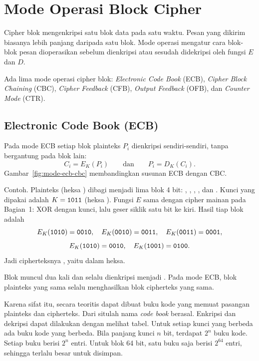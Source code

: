 \section{Mode Operasi Block Cipher}
\label{sec:mode-operasi}

Cipher blok mengenkripsi satu blok data pada satu waktu. Pesan yang dikirim
biasanya lebih panjang daripada satu blok. Mode operasi mengatur cara blok-blok
pesan dioperasikan sebelum dienkripsi atau sesudah didekripsi oleh fungsi $E$
dan $D$.

Ada lima mode operasi cipher blok: \textit{Electronic Code Book} (ECB),
\textit{Cipher Block Chaining} (CBC), \textit{Cipher Feedback} (CFB),
\textit{Output Feedback} (OFB), dan \textit{Counter Mode} (CTR).

\subsection{Electronic Code Book (ECB)}

Pada mode ECB setiap blok plainteks $P_i$ dienkripsi sendiri-sendiri, tanpa
bergantung pada blok lain:
\begin{equation}
C_i = E_K(P_i) \qquad \text{dan} \qquad P_i = D_K(C_i).
\label{eq:ecb}
\end{equation}
Gambar~\ref{fig:mode-ecb-cbc} membandingkan susunan ECB dengan CBC.



Contoh. Plainteks  (heksa ) dibagi menjadi
lima blok 4 bit: , , , , dan
. Kunci yang dipakai adalah $K = \texttt{1011}$ (heksa ).
Fungsi $E$ sama dengan cipher mainan pada Bagian~1: XOR dengan kunci, lalu geser
siklik satu bit ke kiri. Hasil tiap blok adalah
\[
E_K(\texttt{1010}) = \texttt{0010}, \quad
E_K(\texttt{0010}) = \texttt{0011}, \quad
E_K(\texttt{0011}) = \texttt{0001},
\]
\[
E_K(\texttt{1010}) = \texttt{0010}, \quad
E_K(\texttt{1001}) = \texttt{0100}.
\]
Jadi cipherteksnya , yaitu  dalam heksa.

Blok  muncul dua kali dan selalu dienkripsi menjadi .
Pada mode ECB, blok plainteks yang sama selalu menghasilkan blok cipherteks
yang sama.

Karena sifat itu, secara teoritis dapat dibuat buku kode yang memuat pasangan
plainteks dan cipherteks. Dari situlah nama \textit{code book} berasal.
Enkripsi dan dekripsi dapat dilakukan dengan melihat tabel. Untuk setiap kunci
yang berbeda ada buku kode yang berbeda. Bila panjang kunci $n$ bit, terdapat
$2^n$ buku kode. Setiap buku berisi $2^n$ entri. Untuk blok 64 bit, satu buku
saja berisi $2^{64}$ entri, sehingga terlalu besar untuk disimpan.

